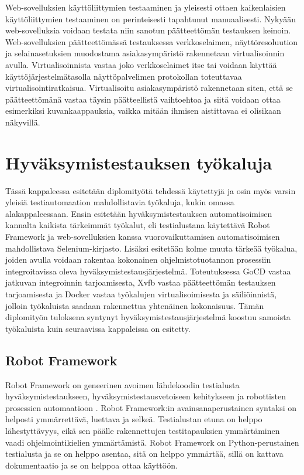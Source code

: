   Web-sovelluksien käyttöliittymien testaaminen ja yleisesti ottaen kaikenlaisien käyttöliittymien testaaminen on perinteisesti tapahtunut manuaalisesti.
  Nykyään web-sovelluksia voidaan testata niin sanotun päätteettömän testauksen keinoin.
  Web-sovelluksien päätteettömässä testauksessa verkkoselaimen, näyttöresoluution ja selainasetuksien muodostama asiakasympäristö rakennetaan virtualisoinnin avulla.
  Virtualisoinnista vastaa joko verkkoselaimet itse tai voidaan käyttää käyttöjärjestelmätasolla näyttöpalvelimen protokollan toteuttavaa virtualisointiratkaisua.
  Virtualisoitu asiakasympäristö rakennetaan siten, että se päätteettömänä vastaa täysin päätteellistä vaihtoehtoa ja siitä voidaan ottaa esimerkiksi kuvankaappauksia, vaikka mitään ihmisen aistittavaa ei olisikaan näkyvillä.

\section{Hyväksymistestauksen työkaluja} \label{ch:08_hyvaksymistestauksen_tyokaluja}

  Tässä kappaleessa esitetään diplomityötä tehdessä käytettyjä ja osin myös varsin yleisiä testiautomaation mahdollistavia työkaluja, kukin omassa alakappaleessaan.
  Ensin esitetään hyväksymistestauksen automatisoimisen kannalta kaikista tärkeimmät työkalut, eli testialustana käytettävä Robot Framework ja web-sovelluksien kanssa vuorovaikuttamisen automatisoimisen mahdollistava Selenium-kirjasto.
  Lisäksi esitetään kolme muuta tärkeää työkalua, joiden avulla voidaan rakentaa kokonainen ohjelmistotuotannon prosessiin integroitavissa oleva hyväksymistestausjärjestelmä.
  Toteutuksessa GoCD vastaa jatkuvan integroinnin tarjoamisesta, Xvfb vastaa päätteettömän testauksen tarjoamisesta ja Docker vastaa työkalujen virtualisoimisesta ja säiliöinnistä, jolloin työkaluista saadaan rakennettua yhtenäinen kokonaisuus.
  Tämän diplomityön tuloksena syntynyt hyväksymistestausjärjestelmä koostuu samoista työkaluista kuin seuraavissa kappaleissa on esitetty.

  \subsection{Robot Framework} \label{ch:08_robot_framework}

    Robot Framework on geneerinen avoimen lähdekoodin testialusta hyväksymistestaukseen, hyväksymistestausvetoiseen kehitykseen ja robottisten prosessien automaatioon \parencite{noauthor_robot_nodate}.
    Robot Framework:in avainsanaperustainen syntaksi on helposti ymmärrettävä, luettava ja selkeä.
    Testialustan etuna on helppo lähestyttävyys, eikä sen päälle rakennettujen testitapauksien ymmärtäminen vaadi ohjelmointikielien ymmärtämistä.
    Robot Framework on Python-perustainen testialusta ja se on helppo asentaa, sitä on helppo ymmärtää, sillä on kattava dokumentaatio ja se on helppoa ottaa käyttöön.

